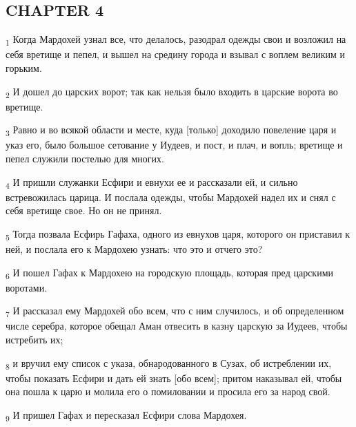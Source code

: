 \subsection{CHAPTER 4}
\begin{tcolorbox}
\textsubscript{1} Когда Мардохей узнал все, что делалось, разодрал одежды свои и возложил на себя вретище и пепел, и вышел на средину города и взывал с воплем великим и горьким.
\end{tcolorbox}
\begin{tcolorbox}
\textsubscript{2} И дошел до царских ворот; так как нельзя было входить в царские ворота во вретище.
\end{tcolorbox}
\begin{tcolorbox}
\textsubscript{3} Равно и во всякой области и месте, куда [только] доходило повеление царя и указ его, было большое сетование у Иудеев, и пост, и плач, и вопль; вретище и пепел служили постелью для многих.
\end{tcolorbox}
\begin{tcolorbox}
\textsubscript{4} И пришли служанки Есфири и евнухи ее и рассказали ей, и сильно встревожилась царица. И послала одежды, чтобы Мардохей надел их и снял с себя вретище свое. Но он не принял.
\end{tcolorbox}
\begin{tcolorbox}
\textsubscript{5} Тогда позвала Есфирь Гафаха, одного из евнухов царя, которого он приставил к ней, и послала его к Мардохею узнать: что это и отчего это?
\end{tcolorbox}
\begin{tcolorbox}
\textsubscript{6} И пошел Гафах к Мардохею на городскую площадь, которая пред царскими воротами.
\end{tcolorbox}
\begin{tcolorbox}
\textsubscript{7} И рассказал ему Мардохей обо всем, что с ним случилось, и об определенном числе серебра, которое обещал Аман отвесить в казну царскую за Иудеев, чтобы истребить их;
\end{tcolorbox}
\begin{tcolorbox}
\textsubscript{8} и вручил ему список с указа, обнародованного в Сузах, об истреблении их, чтобы показать Есфири и дать ей знать [обо всем]; притом наказывал ей, чтобы она пошла к царю и молила его о помиловании и просила его за народ свой.
\end{tcolorbox}
\begin{tcolorbox}
\textsubscript{9} И пришел Гафах и пересказал Есфири слова Мардохея.
\end{tcolorbox}
